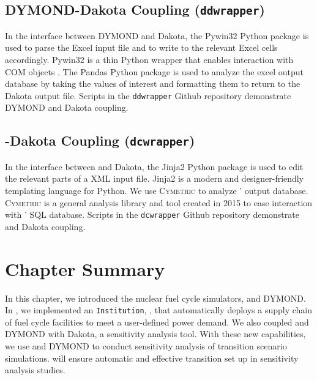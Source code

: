 \subsection{DYMOND-Dakota Coupling (\texttt{ddwrapper})}
In the interface between DYMOND and Dakota, the Pywin32 
\cite{hammond_python_2000}
Python package is used to parse the Excel input file and to 
write to the relevant Excel cells accordingly. 
Pywin32 is a thin Python wrapper that enables interaction 
with COM objects \cite{hammond_python_2000}. 
The Pandas \cite{mckinney_pandas:_2011} Python
package is used to analyze the excel output database 
by taking the values of interest and formatting them 
to return to the Dakota output file.
Scripts in the \texttt{ddwrapper} Github repository \cite{chee_gwenchee/ddwrapper_2019}
demonstrate DYMOND and Dakota coupling. 

\subsection{\Cyclus-Dakota Coupling (\texttt{dcwrapper})}
In the interface between \Cyclus and Dakota, 
the Jinja2 \cite{ronacher_welcome_2018} Python package is used 
to edit the relevant parts of a \Cyclus XML input file. 
Jinja2 is a modern and designer-friendly templating 
language for Python. 
We use \textsc{Cymetric} to analyze \Cyclus' output database. 
\textsc{Cymetric} \cite{scopatz_cymetric_2015} is a general analysis library and 
tool created in 2015 to ease interaction with \Cyclus' SQL database. 
Scripts in the \texttt{dcwrapper} Github repository \cite{chee_arfc/dcwrapper_2019}
demonstrate \Cyclus and Dakota coupling. 


\section{Chapter Summary}
In this chapter, we introduced the nuclear fuel cycle simulators, 
\Cyclus and DYMOND. 
In \Cyclus, we implemented an \texttt{Institution}, \deploy, that automatically deploys
a supply chain of fuel cycle facilities to meet a user-defined power demand. 
We also coupled \Cyclus and DYMOND with Dakota, a sensitivity 
analysis tool. 
With these new capabilities, we use \Cyclus and DYMOND to conduct 
sensitivity analysis of transition scenario simulations. 
\deploy will ensure automatic and effective transition set up in \Cyclus 
sensitivity analysis studies. 
